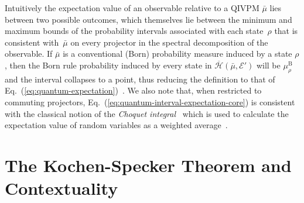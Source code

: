 \documentclass[english,reprint, aps, prl,superscriptaddress, showpacs,
showkeys, longbibliography, amsmath, amssymb, floatfix]{revtex4-1}
\theoremstyle{plain}
\theoremstyle{definition}
\newcommand{\Hilb}{\mathcal{H}}
\newcommand{\events}{\ensuremath{\mathcal{E}}}
\newcommand{\proj}[1]{\op{#1}{#1}}
\newcommand{\ps}{\texttt{+}}
\newcommand{\coreBorn}{\ensuremath{\overline{\Hilb}}}
\begin{document}
\noindent Intuitively the expectation value of an observable relative
to a QIVPM $\bar{\mu}$ lies between two possible outcomes, which
themselves lie between the minimum and maximum bounds of the
probability intervals associated with each state~$\rho$ that is
consistent with~$\bar{\mu}$ on every projector in the spectral
decomposition of the observable. If $\bar{\mu}$ is a conventional
(Born) probability measure induced by a state $\rho$, then the Born
rule probability induced by every state in
$\coreBorn\left(\bar{\mu},\events'\right)$ will be
$\mu_{\rho}^{\mathrm{B}}$ and the interval collapses to a point, thus
reducing the definition to that of
Eq.~(\ref{eq:quantum-expectation})~\citep{HOSTunpublished}.
We also note that, when restricted to commuting projectors,
Eq.~(\ref{eq:quantum-interval-expectation-core}) is consistent with
the classical notion of the \emph{Choquet
  integral}~\citep{Choquet1954,GilboaSchmeidler1994,Grabisch2016}
which is used to calculate the expectation value of random variables
as a weighted average~\citep{HOSTunpublished}.

\section{The Kochen-Specker Theorem and Contextuality}
\label{sec:Kochen-Specker}
  
\end{document}

